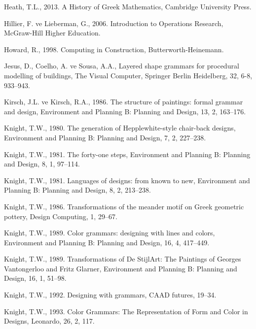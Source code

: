 \documentclass[12pt,turkish,a4paperpaper,]{report}
\begin{document}
\leavevmode\hypertarget{ref-heath2013history}{}%
Heath, T.L., 2013. A History of Greek Mathematics, Cambridge University
Press.

\leavevmode\hypertarget{ref-Hillier:2006tg}{}%
Hillier, F. ve Lieberman, G., 2006. Introduction to Operations Research,
McGraw-Hill Higher Education.

\leavevmode\hypertarget{ref-Howard:1998wf}{}%
Howard, R., 1998. Computing in Construction, Butterworth-Heinemann.

\leavevmode\hypertarget{ref-Jesus:fi}{}%
Jesus, D., Coelho, A. ve Sousa, A.A., Layered shape grammars for
procedural modelling of buildings, The Visual Computer, Springer Berlin
Heidelberg, 32, 6-8, 933--943.

\leavevmode\hypertarget{ref-Kirsch:1986bi}{}%
Kirsch, J.L. ve Kirsch, R.A., 1986. The structure of paintings: formal
grammar and design, Environment and Planning B: Planning and Design, 13,
2, 163--176.

\leavevmode\hypertarget{ref-Knight:1980cl}{}%
Knight, T.W., 1980. The generation of Hepplewhite-style chair-back
designs, Environment and Planning B: Planning and Design, 7, 2,
227--238.

\leavevmode\hypertarget{ref-Knight:1981gp}{}%
Knight, T.W., 1981. The forty-one steps, Environment and Planning B:
Planning and Design, 8, 1, 97--114.

\leavevmode\hypertarget{ref-Knight:1981ky}{}%
Knight, T.W., 1981. Languages of designs: from known to new, Environment
and Planning B: Planning and Design, 8, 2, 213--238.

\leavevmode\hypertarget{ref-Knight:1986wu}{}%
Knight, T.W., 1986. Transformations of the meander motif on Greek
geometric pottery, Design Computing, 1, 29--67.

\leavevmode\hypertarget{ref-Knight:1989ex}{}%
Knight, T.W., 1989. Color grammars: designing with lines and colors,
Environment and Planning B: Planning and Design, 16, 4, 417--449.

\leavevmode\hypertarget{ref-Knight:1989ec}{}%
Knight, T.W., 1989. Transformations of De StijlArt: The Paintings of
Georges Vantongerloo and Fritz Glarner, Environment and Planning B:
Planning and Design, 16, 1, 51--98.

\leavevmode\hypertarget{ref-Knight:1992tp}{}%
Knight, T.W., 1992. Designing with grammars, CAAD futures, 19--34.

\leavevmode\hypertarget{ref-Knight:1993jka}{}%
Knight, T.W., 1993. Color Grammars: The Representation of Form and Color
in Designs, Leonardo, 26, 2, 117.
\end{document}
